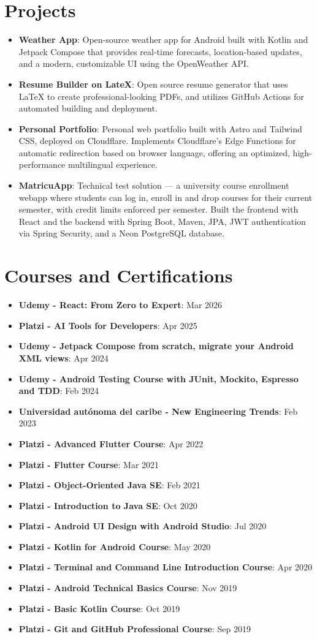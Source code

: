 \documentclass[letterpaper,11pt]{article}
\newcommand{\resumeItem}[2]{
  \item\small{
    \textbf{#1}{: #2 \vspace{-2pt}}
  }
}
\newcommand{\resumeSubItem}[2]{\resumeItem{#1}{#2}\vspace{-4pt}}
\newcommand{\resumeSubHeadingListStart}{\begin{itemize}[leftmargin=*]}
\newcommand{\resumeSubHeadingListEnd}{\end{itemize}}
\begin{document}
\section{Projects}
\resumeSubHeadingListStart
\resumeSubItem{Weather App}
{Open-source weather app for Android built with Kotlin and Jetpack Compose that provides real-time forecasts, location-based updates, and a modern, customizable UI using the OpenWeather API.}
\resumeSubItem{Resume Builder on LateX}
{Open source resume generator that uses LaTeX to create professional-looking PDFs, and utilizes GitHub Actions for automated building and deployment.}
\resumeSubItem{Personal Portfolio}
{Personal web portfolio built with Astro and Tailwind CSS, deployed on Cloudflare. Implements Cloudflare's Edge Functions for automatic redirection based on browser language, offering an optimized, high-performance multilingual experience.}
\resumeSubItem{MatricuApp}
{Technical test solution — a university course enrollment webapp where students can log in, enroll in and drop courses for their current semester, with credit limits enforced per semester. Built the frontend with React and the backend with Spring Boot, Maven, JPA, JWT authentication via Spring Security, and a Neon PostgreSQL database.}
\resumeSubHeadingListEnd

\section{Courses and Certifications}
\resumeSubHeadingListStart
\resumeSubItem{Udemy - React: From Zero to Expert}{Mar 2026}
\resumeSubItem{Platzi - AI Tools for Developers}{Apr 2025}
\resumeSubItem{Udemy - Jetpack Compose from scratch, migrate your Android XML views}{Apr 2024}
\resumeSubItem{Udemy - Android Testing Course with JUnit, Mockito, Espresso and TDD}{Feb 2024}
\resumeSubItem{Universidad autónoma del caribe - New Engineering Trends}{Feb 2023}
\resumeSubItem{Platzi - Advanced Flutter Course}{Apr 2022}
\resumeSubItem{Platzi - Flutter Course}{Mar 2021}
\resumeSubItem{Platzi - Object-Oriented Java SE}{Feb 2021}
\resumeSubItem{Platzi - Introduction to Java SE}{Oct 2020}
\resumeSubItem{Platzi - Android UI Design with Android Studio}{Jul 2020}
\resumeSubItem{Platzi - Kotlin for Android Course}{May 2020}
\resumeSubItem{Platzi - Terminal and Command Line Introduction Course}{Apr 2020}
\resumeSubItem{Platzi - Android Technical Basics Course}{Nov 2019}
\resumeSubItem{Platzi - Basic Kotlin Course}{Oct 2019}
\resumeSubItem{Platzi - Git and GitHub Professional Course}{Sep 2019}
\resumeSubHeadingListEnd
\end{document}
